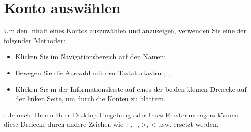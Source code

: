 \section{Konto auswählen\label{accounts-selection}}%

Um den Inhalt eines Kontos auszuwählen und anzuzeigen, verwenden Sie eine der folgenden Methoden:

\begin{itemize}
	\item Klicken Sie im Navigationsbereich auf den Namen;
	\item Bewegen Sie die Auswahl mit den Tastaturtasten \keys{\arrowkeyup}, \keys{\arrowkeydown};
	\item Klicken Sie in der Informationsleiste auf eines der beiden kleinen Dreiecke auf der linken Seite, um durch die Konten zu blättern.
\end{itemize}

\Note{}: Je nach Thema Ihrer Desktop-Umgebung oder Ihres Fenstermanagers können diese Dreiecke durch andere Zeichen wie +, -, >, < usw. ersetzt werden.

